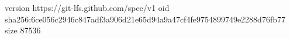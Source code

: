 version https://git-lfs.github.com/spec/v1
oid sha256:6ce056c2946c847adf3a906d21e65d94a9a47cf4fe9754899749e2288d76fb77
size 87536
